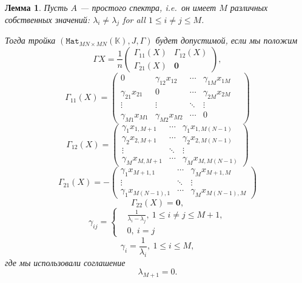 \documentclass[14pt,a4paper]{extarticle}
\newtheorem{lem}{Лемма}
\theoremstyle{definition}
\begin{document}
\begin{lem}
Пусть \( A \) --- простого спектра,
    i.e.\ он имеет \( M \) различных собственных значений:
    \( \lambda_i\neq\lambda_j \) for all \( 1\leq i{\neq}j \leq M \).

    Тогда тройка \( (\mathtt{Mat}_{{MN}{\times}{MN}}(\mathbb{K}), J, \Gamma) \)
    будет допустимой, если мы положим
    \[
        \Gamma X = 
        \frac1n \left(\begin{array}{c|c}
                        \Gamma_{11}(X) & \Gamma_{12}(X) \\ \hline
                        \Gamma_{21}(X) & \mathbf{0}
                      \end{array}\right),
                                      \]
    \[
        \Gamma_{11}(X) =
              \begin{pmatrix}
                0               & \gamma_{12}x_{12} & \cdots & \gamma_{1M}x_{1M} \\
                \gamma_{21}x_{21}  & 0              & \cdots & \gamma_{2M}x_{2M} \\
                \vdots          & \vdots         & \ddots & \vdots & \ \\
                \gamma_{M1}x_{M1}  & \gamma_{M2}x_{M2} & \cdots & 0
              \end{pmatrix}
    \]
    \[
        \Gamma_{12}(X) =
            \begin{pmatrix}
                \gamma_{1}x_{1,M+1} & \cdots & \gamma_{1}x_{1,M(N-1)} \\
                \gamma_{2}x_{2,M+1} & \cdots & \gamma_{2}x_{2,M(N-1)} \\
                \vdots                & \ddots &  \vdots                \\
                \gamma_{M}x_{M,M+1} & \cdots & \gamma_{M}x_{M,M(N-1)}
            \end{pmatrix}
    \]
    \[
        \Gamma_{21}(X) =
            - \begin{pmatrix}
                \gamma_{1}x_{M{+}1,1} &
                \cdots &
                \gamma_{M}x_{M{+}1,M}
                \\
                \vdots & \ddots & \vdots
                \\
                \gamma_{1}x_{M(N-1),1} &
                \cdots &
                \gamma_{M}x_{M(N-1),M}
            \end{pmatrix}
    \]
    \[
        \Gamma_{22}(X) = \mathbf{0},
    \]
    \[
        \gamma_{ij} = \left\{
            \begin{aligned}
                & \frac{1}{\lambda_i - \lambda_j},\ 1\leq i{\neq}j \leq M{+}1,\\
                & 0,\ i=j
            \end{aligned}
            \right.
    \]
    \[
        \gamma_{i} =
                \frac{1}{ \lambda_i},\ 1\leq i \leq M,
    \]
    где мы использовали соглашение
    \[
        \lambda_{M{+}1} = 0.
    \]


\end{lem}
\end{document}
